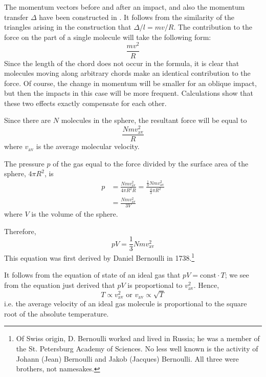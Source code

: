 The momentum vectors before and after an impact, and also the momentum transfer $\Delta$ have been constructed in . It follows from the similarity of the triangles arising in the construction that $\Delta/l = mv/R$. The con­tribution to the force on the part of a single molecule will take the following form:
\begin{equation*}%
\frac{mv^{2}}{R}
\end{equation*}
Since the length of the chord does not occur in the for­mula, it is clear that molecules moving along arbitrary chords make an identical contribution to the force. Of course, the change in momentum will be smaller for an oblique impact, but then the impacts in this case will be more frequent. Calculations show that these two effects exactly compensate for each other.

Since there are $N$ molecules in the sphere, the resultant force will be equal to
\begin{equation*}%
\frac{Nmv^{2}_{\textrm{av}}}{R}
\end{equation*}
where $v_{\textrm{av}}$ is the average molecular velocity.

The pressure $p$ of the gas equal to the force divided by
the surface area of the sphere, $4\pi R^{2}$, is
\begin{align*}%
p &= \frac{Nmv^{2}_{\textrm{av}}}{4 \pi R^{2}R} = \frac{\frac{1}{3}Nmv^{2}_{\textrm{av}}}{\frac{4}{3}\pi R^{2}} \\
& = \frac{Nmv^{2}_{\textrm{av}}}{3V}
\end{align*}
where $V$ is the volume of the sphere. 

Therefore,
\begin{equation*}%
pV = \frac{1}{3} Nmv^{2}_{\textrm{av}}
\end{equation*}
This equation was first derived by Daniel Bernoulli in 1738.\footnote{Of Swiss origin, D. Bernoulli worked and lived in Russia; he was a member of the St. Petersburg Academy of Sciences. No less well known is the activity of Johann (Jean) Bernoulli and Jakob (Jacques) Bernoulli. All three were brothers, not namesakes.}

It follows from the equation of state of an ideal gas that $pV = \textrm{const} \cdot T$; we see from the equation just derived that $pV$ is proportional to $v^{2}_{\textrm{av}}$. Hence,
\begin{equation*}%
T \propto v^{2}_{\textrm{av}} \,\, \text{or} \,\,  v_{\textrm{av}} \propto \sqrt{T}
\end{equation*}
i.e. the average velocity of an ideal gas molecule is proportional to the square root of the absolute temperature.

